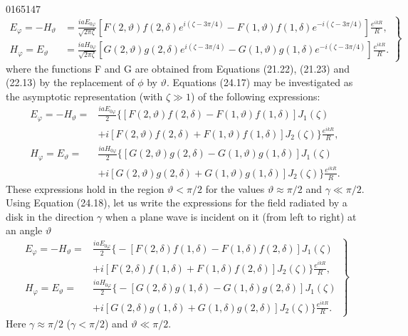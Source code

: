 \begin{scanpage}{0165}{147}
\[
\left.\begin{aligned}E_\varphi=-H_\vartheta&=\frac{iaE_{0\varphi}}{\sqrt{2\pi\zeta}}[F(2,\vartheta)f(2,\delta)e^{i(\zeta-3\pi/4)}-F(1,\vartheta)f(1,\delta)e^{-i(\zeta-3\pi/4)}]\frac{e^{ikR}}R,\\
H_\varphi=E_\vartheta&=\frac{iaH_{0\varphi}}{\sqrt{2\pi\zeta}}[G(2,\vartheta)g(2,\delta)e^{i(\zeta-3\pi/4)}-G(1,\vartheta)g(1,\delta)e^{-i(\zeta-3\pi/4)}]\frac{e^{ikR}}R.
\end{aligned}\right\}\tag{24.17}
\]
where the functions F and G are obtained from Equations (21.22), (21.23) and (22.13) by the replacement of $\phi$ by $\vartheta$. Equations (24.17) may be investigated as the asymptotic representation (with $\zeta\gg1$) of the following expressions:
\[
\begin{aligned}E_\varphi=-H_\vartheta={}&\frac{iaE_{0\varphi}}2\bigl\{[F(2,\vartheta)f(2,\delta)-F(1,\vartheta)f(1,\delta)]J_1(\zeta)\\&+i[F(2,\vartheta)f(2,\delta)+F(1,\vartheta)f(1,\delta)]J_2(\zeta)\bigr\}\frac{e^{ikR}}R,\\
H_\varphi=E_\vartheta={}&\frac{iaH_{0\varphi}}2\bigl\{[G(2,\vartheta)g(2,\delta)-G(1,\vartheta)g(1,\delta)]J_1(\zeta)\\&+i[G(2,\vartheta)g(2,\delta)+G(1,\vartheta)g(1,\delta)]J_2(\zeta)\bigr\}\frac{e^{ikR}}R.
\end{aligned}\tag{24.18}
\]
These expressions hold in the region $\vartheta<\pi/2$ for the values $\vartheta\approx\pi/2$ and $\gamma\ll\pi/2$. Using Equation (24.18), let us write the expressions for the field radiated by a disk in the direction $\gamma$ when a plane wave is incident on it (from left to right) at an angle $\vartheta$
\[
\left.\begin{aligned}E_\varphi=-H_\vartheta={}&\frac{iaE_{0\varphi}}2\bigl\{-[F(2,\delta)f(1,\delta)-F(1,\delta)f(2,\delta)]J_1(\zeta)\\&+i[F(2,\delta)f(1,\delta)+F(1,\delta)f(2,\delta)]J_2(\zeta)\bigr\}\frac{e^{ikR}}R,\\
H_\varphi=E_\vartheta={}&\frac{iaH_{0\varphi}}2\bigl\{-[G(2,\delta)g(1,\delta)-G(1,\delta)g(2,\delta)]J_1(\zeta)\\&+i[G(2,\delta)g(1,\delta)+G(1,\delta)g(2,\delta)]J_2(\zeta)\bigr\}\frac{e^{ikR}}R.
\end{aligned}\right\}\tag{24.19}
\]
Here $\gamma\approx\pi/2$ ($\gamma<\pi/2$) and $\vartheta\ll\pi/2$.
\end{scanpage}
